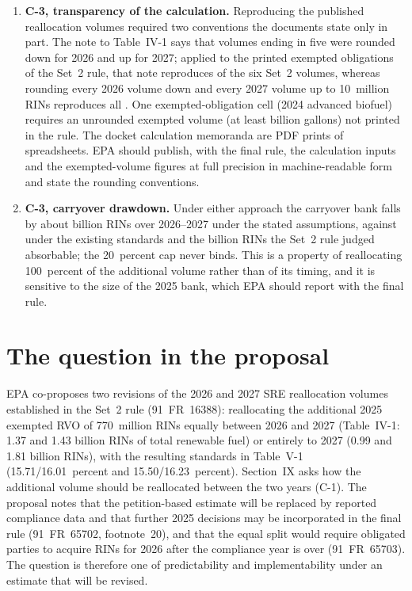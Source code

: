 \documentclass[11pt]{article}
\begin{document}
\begin{enumerate}
\item \textbf{C-3, transparency of the calculation.} Reproducing the published reallocation volumes required two conventions the documents state only in part. The note to Table~IV-1 says that volumes ending in five were rounded down for 2026 and up for 2027; applied to the printed exempted obligations of the Set~2 rule, that note reproduces \valnSrervNearestMatched{} of the six Set~2 volumes, whereas rounding every 2026 volume down and every 2027 volume up to 10~million RINs reproduces all \valnSrervFloorCeilMatched{}. One exempted-obligation cell (2024 advanced biofuel) requires an unrounded exempted volume (at least \valervoMismatchMinVolumeBgal{} billion gallons) not printed in the rule. The docket calculation memoranda are PDF prints of spreadsheets. EPA should publish, with the final rule, the calculation inputs and the exempted-volume figures at full precision in machine-readable form and state the rounding conventions.
\item \textbf{C-3, carryover drawdown.} Under either approach the carryover bank falls by about \valdrawdownTwoYearsEqual{} billion RINs over 2026--2027 under the stated assumptions, against \valdrawdownTwoYearsSetTwo{} under the existing standards and the \valabsorbableDrawdown{} billion RINs the Set~2 rule judged absorbable; the 20~percent cap never binds. This is a property of reallocating 100~percent of the additional volume rather than of its timing, and it is sensitive to the size of the 2025 bank, which EPA should report with the final rule.
\end{enumerate}


\section{The question in the proposal}

EPA co-proposes two revisions of the 2026 and 2027 SRE reallocation volumes established in the Set~2 rule (91~FR~16388): reallocating the additional 2025 exempted RVO of 770~million RINs equally between 2026 and 2027 (Table~IV-1: 1.37 and 1.43 billion RINs of total renewable fuel) or entirely to 2027 (0.99 and 1.81 billion RINs), with the resulting standards in Table~V-1 (15.71/16.01~percent and 15.50/16.23~percent). Section~IX asks how the additional volume should be reallocated between the two years (C-1). The proposal notes that the petition-based estimate will be replaced by reported compliance data and that further 2025 decisions may be incorporated in the final rule (91~FR~65702, footnote~20), and that the equal split would require obligated parties to acquire RINs for 2026 after the compliance year is over (91~FR~65703). The question is therefore one of predictability and implementability under an estimate that will be revised.
\end{document}
